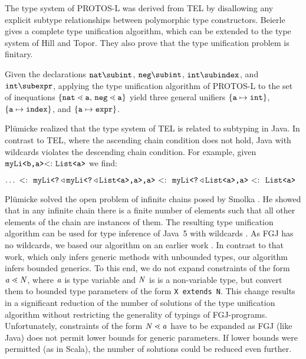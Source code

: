 The type system of \textsf{PROTOS-L} \cite{CB95} was
derived from \textsf{TEL} by disallowing any explicit subtype relationships
between polymorphic type constructors. 
Beierle \cite{CB95} gives a complete type unification algorithm, which can be extended to the
type system of Hill and Topor.
They also prove that the type unification problem is finitary.

Given the declarations  $\texttt{nat} \sub
\texttt{int}$, $\texttt{neg} \sub \texttt{int}$, $\mathtt{int} \sub
\mathtt{index}$, and $\mathtt{int} \sub \mathtt{expr}$, applying the
type unification algorithm of \textsf{PROTOS-L} to the set of
inequations $\set{\mathtt{nat} \lessdot
  \mathtt{a}$, $\mathtt{neg} \lessdot \mathtt{a}}$ yield three general
unifiers $\{ \mathtt{a} \mapsto \texttt{int} \}$, $\{ \mathtt{a} \mapsto
  \mathtt{index} \}$, and $\{ \mathtt{a} \mapsto \mathtt{expr} \}$. 

Pl\"umicke \cite{plue09_1} realized that the type system of
\textsf{TEL} is related to subtyping in Java.
In contrast to \textsf{TEL}, where the ascending chain condition does
not hold,  Java with wildcards violates the descending chain
condition. For example, given $\texttt{myLi}\textrm{{\tt <b,a}}\textrm{{\tt >}} \textrm{$<:$}\ 
\texttt{List}\textrm{{\tt <a}}\textrm{{\tt >}}$ we find:

\smallskip
{\centering
$\ldots \ \olsub\
\exptypett{myLi}{\exptypett{?\,$\extends$\,myLi}{\exptypett{\textrm{{\tt ?}}\,$\extends$\,List}{a},a},a}
\ \olsub\ \exptypett{myLi}{\exptypett{?\,$\extends$\,List}{a},a} \ \olsub\  \exptypett{List}{a}$\\}

\smallskip
Pl\"umicke \cite{plue09_1} solved the open problem of infinite chains
posed by Smolka \cite{GS89}.
He showed that in any infinite chain there is a finite number of elements such that
all other elements of the chain are instances of them. The resulting type
unification algorithm can be used for type inference of Java~5 with
wildcards \cite{Plue07_3}. As FGJ has no wildcards, we based our
algorithm on an earlier work \cite{Plue04_1}.
In contrast to that work, which only infers generic methods with
unbounded types, our algorithm  infers bounded generics.
To this end, we do not expand constraints
of the form $\mathit{ a } \lessdot \mathit{N}$, where $\mathit{ a }$ is type variable and $\mathit{N}$ is is a
non-variable type, but convert them to bounded type parameters of the form
\texttt{X extends N}. This change results in a significant reduction
of the number of solutions of the type
unification algorithm without restricting the generality of typings of
FGJ-programs. Unfortunately, constraints of the form $\mathit{N} \lessdot \mathit{ a }$ have
to be expanded as FGJ (like Java) does not permit lower bounds for
generic parameters. If lower bounds were permitted  (as in Scala), the
number of solutions could be reduced even further.


